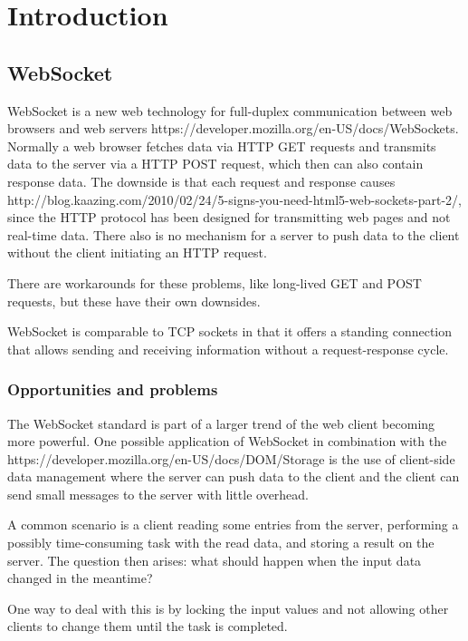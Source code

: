 
\chapter{Introduction}

\section{WebSocket}

WebSocket is a new web technology for full-duplex communication between web
browsers and web servers\fnurl{}
{https://developer.mozilla.org/en-US/docs/WebSockets}. Normally a web
browser fetches data via HTTP GET requests and transmits data to the server via
a HTTP POST request, which then can also contain response data. The downside is
that each request and response causes 
{http://blog.kaazing.com/2010/02/24/5-signs-you-need-html5-web-sockets-part-2/}, 
since the HTTP protocol has been designed for transmitting web pages and not
real-time data.  There also is no mechanism for a server to push data to the
client without the client initiating an HTTP request.

There are workarounds for these problems, like long-lived GET and POST requests,
but these have their own downsides.

WebSocket is comparable to TCP sockets in that it offers a standing connection
that allows sending and receiving information without a request-response cycle.

\subsection{Opportunities and problems}

The WebSocket standard is part of a larger trend of the web client becoming more
powerful. One possible application of WebSocket in combination with the
{https://developer.mozilla.org/en-US/docs/DOM/Storage} is the use of client-side
data management where the server can push data to the client and the client can
send small messages to the server with little overhead.

A common scenario is a client reading some entries from the server, performing a
possibly time-consuming task with the read data, and storing a result on the
server. The question then arises: what should happen when the input data changed
in the meantime?

One way to deal with this is by locking the input values and not allowing
other clients to change them until the task is completed.

